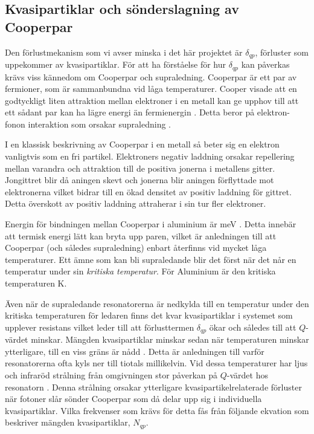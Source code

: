\documentclass[main.tex]{subfiles}
\begin{document}
\subsection{Kvasipartiklar och sönderslagning av Cooperpar}
\label{sec:cooper}
Den förlustmekanism som vi avser minska i det här projektet är $\delta_{qp}$, förluster som uppekommer av kvasipartiklar. För att ha förståelse för hur $\delta_{qp}$ kan påverkas krävs viss kännedom om Cooperpar och supraledning. Cooperpar är ett par av fermioner, som är sammanbundna vid låga temperaturer. Cooper visade att en godtyckligt liten attraktion mellan elektroner i en metall kan ge upphov till att ett sådant par kan ha lägre energi än fermienergin \cite{Kittel2005}. Detta beror på elektron-fonon interaktion som orsakar supraledning \cite{Kittel2005}.

I en klassisk beskrivning av Cooperpar i en metall så beter sig en elektron vanligtvis som en fri partikel. Elektroners negativ laddning orsakar repellering mellan varandra och attraktion till de positiva jonerna i metallens gitter. Jongittret blir då aningen skevt och jonerna blir aningen förflyttade mot elektronerna vilket bidrar till en ökad densitet av positiv laddning för gittret. Detta överskott av positiv laddning attraherar i sin tur fler elektroner. 

Energin för bindningen mellan Cooperpar i aluminium är \unit[0,39]{meV} \cite{Kittel2005}. Detta innebär att termisk energi lätt kan bryta upp paren, vilket är anledningen till att Cooperpar (och således supraledning) enbart återfinns vid mycket låga temperaturer. Ett ämne som kan bli supraledande blir det först när det når en temperatur under sin \emph{kritiska temperatur}. För Aluminium är den kritiska temperaturen \unit[1,2]{K}.





Även när de supraledande resonatorerna är nedkylda till en temperatur under den kritiska temperaturen för ledaren finns det kvar kvasipartiklar i systemet som upplever resistans vilket leder till att förlusttermen $\delta_{qp}$ ökar och således till att $Q$-värdet minskar. Mängden kvasipartiklar minskar sedan när temperaturen minskar ytterligare, till en viss gräns är nådd \cite{Barends2011}. Detta är anledningen till varför resonatorerna ofta kyls ner till tiotals millikelvin. Vid dessa temperaturer har ljus och infraröd strålning från omgivningen stor påverkan på $Q$-värdet hos resonatorn \cite{Barends2011}. Denna strålning orsakar ytterligare kvasipartikelrelaterade förluster när fotoner slår sönder Cooperpar som då delar upp sig i individuella kvasipartiklar. Vilka frekvenser som krävs för detta fås från följande ekvation som beskriver mängden kvasipartiklar, $N_{qp}$.
\end{document}
